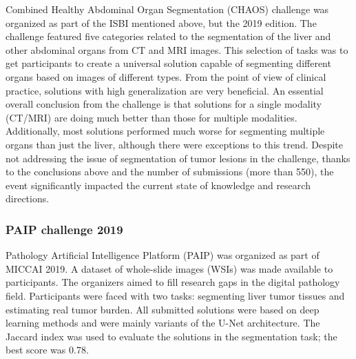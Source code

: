Combined Healthy Abdominal Organ Segmentation (CHAOS) \cite{kavur_chaos_2021} challenge was organized as part of the ISBI mentioned above, but the 2019 edition. The challenge featured five categories related to the segmentation of the liver and other abdominal organs from CT and MRI images. This selection of tasks was to get participants to create a universal solution capable of segmenting different organs based on images of different types. From the point of view of clinical practice, solutions with high generalization are very beneficial. An essential overall conclusion from the challenge is that solutions for a single modality (CT/MRI) are doing much better than those for multiple modalities. Additionally, most solutions performed much worse for segmenting multiple organs than just the liver, although there were exceptions to this trend. Despite not addressing the issue of segmentation of tumor lesions in the challenge, thanks to the conclusions above and the number of submissions (more than 550), the event significantly impacted the current state of knowledge and research directions.


\subsubsection{PAIP challenge 2019}
Pathology Artificial Intelligence Platform (PAIP) \cite{kim_paip_2021} was organized as part of MICCAI 2019. A dataset of whole-slide images (WSIs) was made available to participants. The organizers aimed to fill research gaps in the digital pathology field. Participants were faced with two tasks: segmenting liver tumor tissues and estimating real tumor burden. All submitted solutions were based on deep learning methods and were mainly variants of the U-Net architecture. The Jaccard index was used to evaluate the solutions in the segmentation task; the best score was 0.78.




